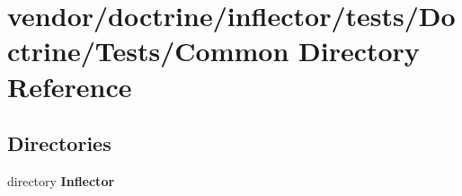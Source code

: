 \section{vendor/doctrine/inflector/tests/\+Doctrine/\+Tests/\+Common Directory Reference}
\label{dir_02c0db566a10ab1d606f297840d4323a}
\subsection*{Directories}
\begin{DoxyCompactItemize}
\item 
directory {\bf Inflector}
\end{DoxyCompactItemize}
